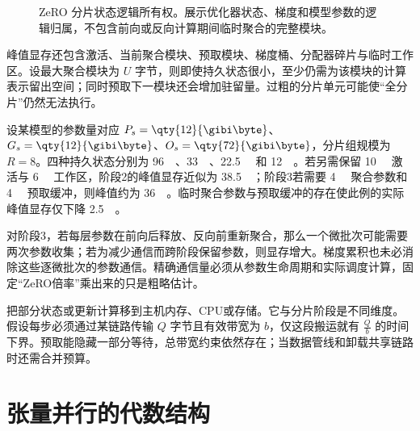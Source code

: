 \documentclass[../textbook.tex]{subfiles}
\begin{document}
\begin{figure}[htbp]
\centering
{}
\caption[ZeRO 分片状态逻辑所有权]{ZeRO 分片状态逻辑所有权。展示优化器状态、梯度和模型参数的逻辑归属，不包含前向或反向计算期间临时聚合的完整模块。}\label{fig:dist-zero}
\end{figure}

峰值显存还包含激活、当前聚合模块、预取模块、梯度桶、分配器碎片与临时工作区。设最大聚合模块为 $U$ 字节，则即使持久状态很小，至少仍需为该模块的计算表示留出空间；同时预取下一模块还会增加驻留量。过粗的分片单元可能使“全分片”仍然无法执行。

\begin{example}[状态分片的容量与通信量]
设某模型的参数量对应 $P_s=\qty{12}{\gibi\byte}$、$G_s=\qty{12}{\gibi\byte}$、$O_s=\qty{72}{\gibi\byte}$，分片组规模为 $R=8$。四种持久状态分别为 \qty{96}{\gibi\byte}、\qty{33}{\gibi\byte}、\qty{22.5}{\gibi\byte} 和 \qty{12}{\gibi\byte}。若另需保留 \qty{10}{\gibi\byte} 激活与 \qty{6}{\gibi\byte} 工作区，阶段2的峰值显存近似为 \qty{38.5}{\gibi\byte}；阶段3若需要 \qty{4}{\gibi\byte} 聚合参数和 \qty{4}{\gibi\byte} 预取缓冲，则峰值约为 \qty{36}{\gibi\byte}。临时聚合参数与预取缓冲的存在使此例的实际峰值显存仅下降 \qty{2.5}{\gibi\byte}。

对阶段3，若每层参数在前向后释放、反向前重新聚合，那么一个微批次可能需要两次参数收集；若为减少通信而跨阶段保留参数，则显存增大。梯度累积也未必消除这些逐微批次的参数通信。精确通信量必须从参数生命周期和实际调度计算，固定“ZeRO倍率”乘出来的只是粗略估计。
\end{example}

把部分状态或更新计算移到主机内存、CPU或存储。它与分片阶段是不同维度。假设每步必须通过某链路传输 $Q$ 字节且有效带宽为 $b$，仅这段搬运就有 $\frac{Q}{b}$ 的时间下界。预取能隐藏一部分等待，总带宽约束依然存在；当数据管线和卸载共享链路时还需合并预算。

\section{张量并行的代数结构}
\end{document}
